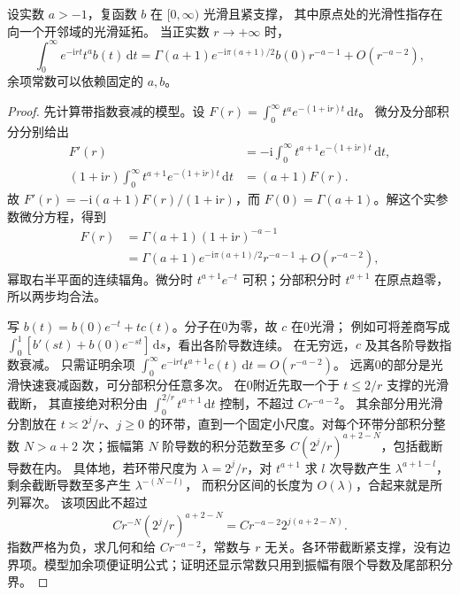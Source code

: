 \begin{lemma}[幂型端点的首项]\label{b2:lem:A2-endpoint-asymptotic}
设实数 \(a>-1\)，复函数 \(b\) 在 \([0,\infty)\) 光滑且紧支撑，
其中原点处的光滑性指存在向一个开邻域的光滑延拓。
当正实数 \(r\to+\infty\) 时，
\[
 \int_0^\infty e^{-\mathrm irt}t^ab(t)\,\mathrm dt
 =\Gamma(a+1)e^{-\mathrm i\pi(a+1)/2}b(0)r^{-a-1}
 +O(r^{-a-2}),
\]
余项常数可以依赖固定的 \(a,b\)。
\end{lemma}
\begin{proof}
先计算带指数衰减的模型。设
\(F(r)=\int_0^\infty t^ae^{-(1+\mathrm ir)t}\,\mathrm dt\)。
微分及分部积分分别给出
\[
 \begin{aligned}
 F'(r)&=-\mathrm i\int_0^\infty
 t^{a+1}e^{-(1+\mathrm ir)t}\,\mathrm dt,\\
 (1+\mathrm ir)\int_0^\infty
 t^{a+1}e^{-(1+\mathrm ir)t}\,\mathrm dt&=(a+1)F(r).
 \end{aligned}
\]
故 \(F'(r)=-\mathrm i(a+1)F(r)/(1+\mathrm ir)\)，而
\(F(0)=\Gamma(a+1)\)。解这个实参数微分方程，得到
\[
 \begin{aligned}
 F(r)&=\Gamma(a+1)(1+\mathrm ir)^{-a-1}\\
 &=\Gamma(a+1)e^{-\mathrm i\pi(a+1)/2}r^{-a-1}
 +O(r^{-a-2}),
 \end{aligned}
\]
幂取右半平面的连续辐角。微分时 \(t^{a+1}e^{-t}\) 可积；分部积分时 \(t^{a+1}\) 在原点趋零，所以两步均合法。

写 \(b(t)=b(0)e^{-t}+t c(t)\)。分子在0为零，故 \(c\) 在0光滑；
例如可将差商写成
\(\int_0^1[b'(st)+b(0)e^{-st}]\,\mathrm ds\)，看出各阶导数连续。
在无穷远，\(c\) 及其各阶导数指数衰减。
只需证明余项
\(\int_0^\infty e^{-\mathrm irt}t^{a+1}c(t)\,\mathrm dt=O(r^{-a-2})\)。
远离0的部分是光滑快速衰减函数，可分部积分任意多次。
在0附近先取一个于 \(t\leq2/r\) 支撑的光滑截断，
其直接绝对积分由
\(\int_0^{2/r}t^{a+1}\,\mathrm dt\) 控制，不超过 \(Cr^{-a-2}\)。
其余部分用光滑分割放在
\(t\asymp2^j/r\)、\(j\ge0\) 的环带，直到一个固定小尺度。对每个环带分部积分整数 \(N>a+2\) 次；振幅第 \(N\) 阶导数的积分范数至多
\(C(2^j/r)^{a+2-N}\)，包括截断导数在内。
具体地，若环带尺度为 \(\lambda=2^j/r\)，对 \(t^{a+1}\) 求 \(l\) 次导数产生
\(\lambda^{a+1-l}\)，剩余截断导数至多产生 \(\lambda^{-(N-l)}\)，
而积分区间的长度为 \(O(\lambda)\)，合起来就是所列幂次。
该项因此不超过
\[
Cr^{-N}(2^j/r)^{a+2-N}
=Cr^{-a-2}2^{j(a+2-N)}.
\]
指数严格为负，求几何和给 \(Cr^{-a-2}\)，常数与 \(r\) 无关。各环带截断紧支撑，没有边界项。模型加余项便证明公式；证明还显示常数只用到振幅有限个导数及尾部积分界。
\end{proof}

